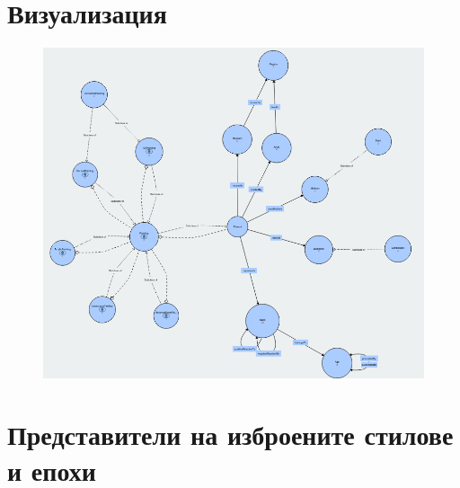 \documentclass[a4paper, 11pt]{article}
\begin{document}
\section*{Визуализация}
\begin{figure}[H]
  \centering
  \includegraphics[width=\linewidth]{images/onto.png}  
\end{figure}
\section*{Представители на изброените стилове и епохи}
\end{document}
